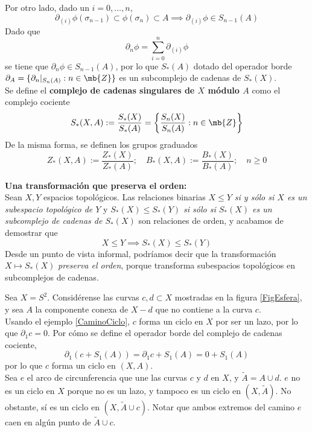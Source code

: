 Por otro lado, dado un $i=0,\dots,n$, $$\partial_{(i)} \phi(\sigma_{n-1}) \subset \phi(\sigma_n) \subset A \implies \partial_{(i)}\phi \in S_{n-1}(A)$$ Dado que $$\partial_n \phi=\sum^n_{i=0}\partial_{(i)}\phi$$ se tiene que $\partial_n \phi \in S_{n-1}(A)$, por lo que $S_*(A)$ dotado del operador borde $\partial_A=\{\partial_n|_{S_n(A)}: n \in \mb{Z}\}$ es un subcomplejo de cadenas de $S_*(X)$.
\\

Se define el \textbf{complejo de cadenas singulares de $X$ módulo $A$} como el complejo cociente $$S_*(X,A):=\frac{S_*(X)}{S_*(A)}=\left\{\frac{S_n(X)}{S_n(A)}: n \in \mb{Z}\right\}$$ De la misma forma, se definen los grupos graduados $$Z_*(X,A):=\frac{Z_*(X)}{Z_*(A)}; \quad B_*(X,A):=\frac{B_*(X)}{B_*(A)}; \quad n \geq 0$$

\noindent\textbf{Una transformación que preserva el orden:}\\
Sean $X,Y$ espacios topológicos. Las relaciones binarias \textit{$X \leq Y$ si y sólo si $X$ es un subespacio topológico de $Y$} y \textit{$S_*(X) \leq S_*(Y)$ si sólo si $S_*(X)$ es un subcomplejo de cadenas de $S_*(X)$} son relaciones de orden, y acabamos de demostrar que $$X \leq Y \implies S_*(X) \leq S_*(Y)$$ Desde un punto de vista informal, podríamos decir que la transformación $X \mapsto S_*(X)$ \textit{preserva el orden}, porque transforma subespacios topológicos en subcomplejos de cadenas.


\begin{ejem}\label{EjEsfera}
Sea $X=S^2$. Considérense las curvas $c,d \subset X$ mostradas en la figura \ref{FigEsfera}, y sea $A$ la componente conexa de $X-d$ que no contiene a la curva $c$.
\\

Usando el ejemplo \ref{CaminoCiclo}, $c$ forma un ciclo en $X$ por ser un lazo, por lo que $\partial_1 c=0$. Por cómo se define el operador borde del complejo de cadenas cociente, $$\partial_1(c+S_1(A))=\partial_1 c+S_1(A)=0+S_1(A)$$ por lo que $c$ forma un ciclo en $(X,A)$.
\\

Sea $e$ el arco de circunferencia que une las curvas $c$ y $d$ en $X$, y $\tilde{A}=A\cup d$. $e$ no es un ciclo en $X$ porque no es un lazo, y tampoco es un ciclo en $(X,\tilde{A})$. No obstante, sí es un ciclo en $(X,\tilde{A}\cup c)$. Notar que ambos extremos del camino $e$ caen en algún punto de $\tilde{A}\cup c$.
\end{ejem}


